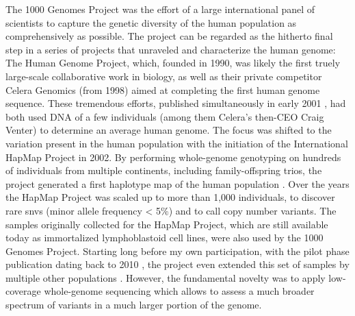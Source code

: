 The 1000 Genomes Project was the effort of a large international panel of
scientists to capture the genetic diversity of the human population as
comprehensively as possible. The project can be regarded as the hitherto final
step in a series of projects that unraveled and characterize the human genome:
The Human Genome Project, which, founded in 1990, was likely the first truely large-scale
collaborative work in biology, as well as their private competitor Celera
Genomics (from 1998) aimed at completing the first human genome sequence.
These tremendous efforts, published simultaneously in early
2001 \citep{Lander2001,Venter2001}, had both used DNA of a few individuals (among
them Celera’s then-CEO Craig Venter) to determine an average human genome. The
focus was shifted to the variation present in the human population with the
initiation of the International HapMap Project in 2002. By performing
whole-genome \snv genotyping on hundreds of individuals from multiple continents,
including family-offspring trios, the project generated a first haplotype map of
the human population \citep{InternationalHapMapConsortium2005,Frazer2007,Altshuler2010}.
Over the years the HapMap Project was scaled up to more than 1,000 individuals,
to discover rare \acp{snv}  (minor allele frequency < 5\%) and to call copy number
variants. The samples originally collected for the HapMap Project, which are
still available today as immortalized lymphoblastoid cell lines, were also used
by the 1000 Genomes Project. Starting long before my own participation, with
the pilot phase publication dating back to 2010 \citep{Durbin2010}, the project
even extended this set of samples by multiple other
populations \citep{1000GenomesProjectConsortium2012}. However, the fundamental
novelty was to apply low-coverage whole-genome sequencing which allows to assess
a much broader spectrum of variants in a much larger portion of the genome.

